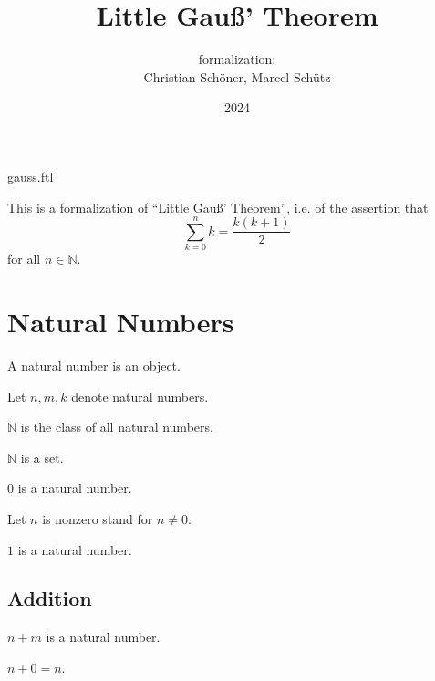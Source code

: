 \documentclass[english]{article}
\title{Little Gauß' Theorem}
\author{\Naproche formalization:\\[0.5em]Christian Schöner, Marcel Schütz}
\date{2024}
\begin{document}
\begin{smodule}{gauss.ftl}
\maketitle

\noindent This is a formalization of ``Little Gauß' Theorem'', i.e. of
the assertion that
\[\sum_{k = 0}^n k = \frac{k(k + 1)}2\]
for all $n \in \mathbb{N}$.

\section{Natural Numbers}

\begin{forthel}

  \begin{signature}
    A natural number is an object.

    Let $n, m, k$ denote natural numbers.
  \end{signature}

  \begin{definition}
    $\mathbb{N}$ is the class of all natural numbers.
  \end{definition}

  \begin{axiom}[title=Infinity Axiom]
    $\mathbb{N}$ is a set.
  \end{axiom}

  \begin{signature}
    $0$ is a natural number.

    Let $n$ is nonzero stand for $n \neq 0$.
  \end{signature}

  \begin{signature}
    $1$ is a natural number.
  \end{signature}
\end{forthel}


\subsection{Addition}

\begin{forthel}
  \begin{signature}
    $n + m$ is a natural number.
  \end{signature}

  \begin{axiom}[title=Addition Axiom I]
    $n + 0 = n$.
  \end{axiom}


\end{forthel}
\end{smodule}
\end{document}
